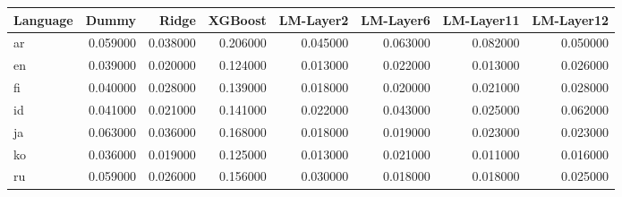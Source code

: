 \begin{tabular}{lrrrrrrr}
\toprule
Language & Dummy & Ridge & XGBoost & LM-Layer2 & LM-Layer6 & LM-Layer11 & LM-Layer12 \\
\midrule
ar & 0.059000 & 0.038000 & 0.206000 & 0.045000 & 0.063000 & 0.082000 & 0.050000 \\
en & 0.039000 & 0.020000 & 0.124000 & 0.013000 & 0.022000 & 0.013000 & 0.026000 \\
fi & 0.040000 & 0.028000 & 0.139000 & 0.018000 & 0.020000 & 0.021000 & 0.028000 \\
id & 0.041000 & 0.021000 & 0.141000 & 0.022000 & 0.043000 & 0.025000 & 0.062000 \\
ja & 0.063000 & 0.036000 & 0.168000 & 0.018000 & 0.019000 & 0.023000 & 0.023000 \\
ko & 0.036000 & 0.019000 & 0.125000 & 0.013000 & 0.021000 & 0.011000 & 0.016000 \\
ru & 0.059000 & 0.026000 & 0.156000 & 0.030000 & 0.018000 & 0.018000 & 0.025000 \\
\bottomrule
\end{tabular}
